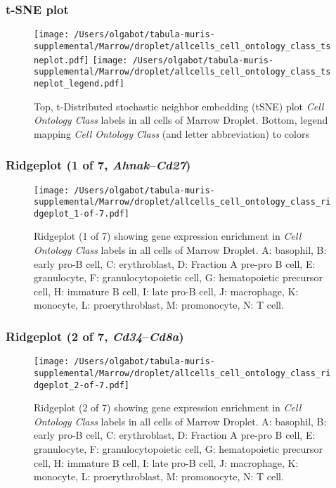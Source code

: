 \clearpage
\subsubsection{t-SNE plot}
\begin{figure}[h]
\centering
\texttt{[image: /Users/olgabot/tabula-muris-supplemental/Marrow/droplet/allcells\_cell\_ontology\_class\_tsneplot.pdf]}
\texttt{[image: /Users/olgabot/tabula-muris-supplemental/Marrow/droplet/allcells\_cell\_ontology\_class\_tsneplot\_legend.pdf]}
\caption{Top, t-Distributed stochastic neighbor embedding (tSNE) plot  \emph{Cell Ontology Class} labels in all cells of Marrow Droplet. Bottom, legend mapping \emph{Cell Ontology Class} (and letter abbreviation) to colors}
\end{figure}


\clearpage

\subsubsection{Ridgeplot (1 of 7, \emph{Ahnak}--\emph{Cd27})}
\begin{figure}[h]
\centering
\texttt{[image: /Users/olgabot/tabula-muris-supplemental/Marrow/droplet/allcells\_cell\_ontology\_class\_ridgeplot\_1-of-7.pdf]}

\caption{ Ridgeplot (1 of 7)  showing gene expression enrichment in \emph{Cell Ontology Class} labels in all cells of Marrow Droplet. A: basophil, B: early pro-B cell, C: erythroblast, D: Fraction A pre-pro B cell, E: granulocyte, F: granulocytopoietic cell, G: hematopoietic precursor cell, H: immature B cell, I: late pro-B cell, J: macrophage, K: monocyte, L: proerythroblast, M: promonocyte, N: T cell.}
\end{figure}


\clearpage

\subsubsection{Ridgeplot (2 of 7, \emph{Cd34}--\emph{Cd8a})}
\begin{figure}[h]
\centering
\texttt{[image: /Users/olgabot/tabula-muris-supplemental/Marrow/droplet/allcells\_cell\_ontology\_class\_ridgeplot\_2-of-7.pdf]}

\caption{ Ridgeplot (2 of 7)  showing gene expression enrichment in \emph{Cell Ontology Class} labels in all cells of Marrow Droplet. A: basophil, B: early pro-B cell, C: erythroblast, D: Fraction A pre-pro B cell, E: granulocyte, F: granulocytopoietic cell, G: hematopoietic precursor cell, H: immature B cell, I: late pro-B cell, J: macrophage, K: monocyte, L: proerythroblast, M: promonocyte, N: T cell.}
\end{figure}


